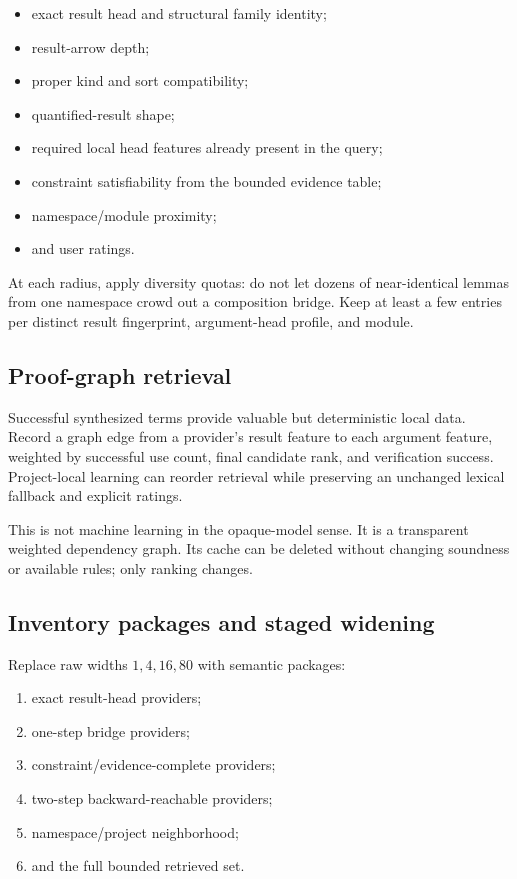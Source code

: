 \documentclass[11pt]{article}
\begin{document}
\begin{itemize}
  \item exact result head and structural family identity;
  \item result-arrow depth;
  \item proper kind and sort compatibility;
  \item quantified-result shape;
  \item required local head features already present in the query;
  \item constraint satisfiability from the bounded evidence table;
  \item namespace/module proximity;
  \item and user ratings.
\end{itemize}

At each radius, apply diversity quotas: do not let dozens of near-identical
lemmas from one namespace crowd out a composition bridge.  Keep at least a few
entries per distinct result fingerprint, argument-head profile, and module.

\subsection{Proof-graph retrieval}

Successful synthesized terms provide valuable but deterministic local data.
Record a graph edge from a provider's result feature to each argument feature,
weighted by successful use count, final candidate rank, and verification
success.  Project-local learning can reorder retrieval while preserving an
unchanged lexical fallback and explicit ratings.

This is not machine learning in the opaque-model sense.  It is a transparent
weighted dependency graph.  Its cache can be deleted without changing
soundness or available rules; only ranking changes.

\subsection{Inventory packages and staged widening}

Replace raw widths \(1,4,16,80\) with semantic packages:

\begin{enumerate}
  \item exact result-head providers;
  \item one-step bridge providers;
  \item constraint/evidence-complete providers;
  \item two-step backward-reachable providers;
  \item namespace/project neighborhood;
  \item and the full bounded retrieved set.
\end{enumerate}
\end{document}

